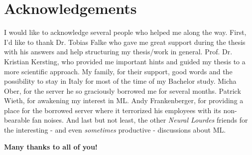 \documentclass[report,type=bsc,colorback,accentcolor=tud9c,bigchapter,bibliography=totoc,11pt]{tudthesis}
\author{David Marlon Gengenbach}
\begin{document}
  \makethesistitle
  \tableofcontents
  \newpage
  \setcounter{page}{1}
  \abstract{}
  \newpage
  
  \newpage

  \printbibliography[heading=bibintoc]
  
  \listoffigures
  \listoftables
  
  \newpage
  \section*{Acknowledgements}
  I would like to acknowledge several people who helped me along the way.
  First, I'd like to thank Dr. Tobias Falke who gave me great support during the thesis with his answers and help structuring my thesis/work in general.
  Prof. Dr. Kristian Kersting, who provided me important hints and guided my thesis to a more scientific approach.
  My family, for their support, good words and the possibility to stay in Italy for most of the time of my Bachelor study.
  Micha Ober, for the server he so graciously borrowed me for several months.
  Patrick Wieth, for awakening my interest in ML.
  Andy Frankenberger, for providing a place for the borrowed server where it terrorized his employees with its non-bearable fan noises.
  And last but not least, the other \textit{Neural Lourdes} friends for the interesting - and even \textit{sometimes} productive - discussions about ML.
  
  \centering\textsf{\textbf{Many thanks to all of you!}}
\end{document}
